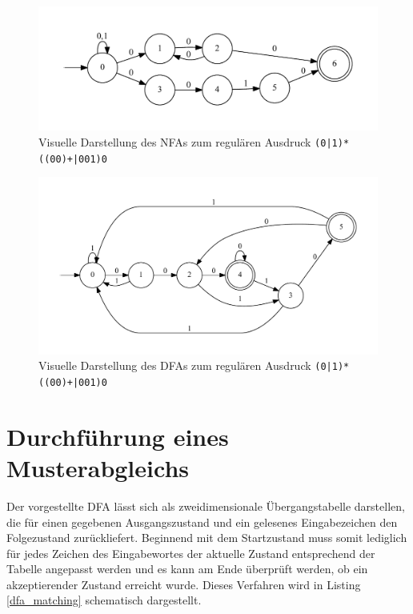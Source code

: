 \begin{figure}[ht]
	\includegraphics[width=\textwidth]{bilder/nfa_beispiel.pdf}
	\caption{Visuelle Darstellung des NFAs zum regulären Ausdruck \texttt{(0|1)*((00)+|001)0}}
	\label{nfa_beispiel}
\end{figure}

\begin{figure}[ht]
	\includegraphics[width=\textwidth]{bilder/dfa_beispiel.pdf}
	\caption{Visuelle Darstellung des DFAs zum regulären Ausdruck \texttt{(0|1)*((00)+|001)0}}
	\label{dfa_beispiel}
\end{figure}

\section{Durchführung eines Musterabgleichs}

Der vorgestellte DFA lässt sich als zweidimensionale Übergangstabelle darstellen, die für einen gegebenen Ausgangszustand und ein gelesenes Eingabezeichen den Folgezustand zurückliefert.
Beginnend mit dem Startzustand muss somit lediglich für jedes Zeichen des Eingabewortes der aktuelle Zustand entsprechend der Tabelle angepasst werden und es kann am Ende überprüft werden, ob ein akzeptierender Zustand erreicht wurde.
Dieses Verfahren wird in Listing \ref{dfa_matching} schematisch dargestellt.

